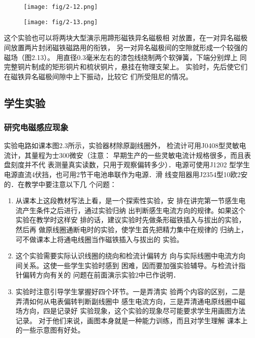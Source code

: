 \begin{figure}[htp]\centering
    \begin{minipage}[t]{0.48\textwidth}
    \centering
\texttt{[image: fig/2-12.png]}
    \caption{}
    \end{minipage}
    \begin{minipage}[t]{0.48\textwidth}
    \centering
\texttt{[image: fig/2-13.png]}
    \caption{}
    \end{minipage}
    \end{figure}

    这个实验也可以将两块大型演示用蹄形磁铁异名磁极相
对放置，在一对异名磁极间放置两片封闭磁铁磁路用的衔铁，
另一对异名磁极间的空隙就形成一个较强的磁场（图2.13）。
用直径0.3毫米左右的漆包线绕制两个软弹簧，下端分别焊上
同完整铜片制成的矩形铜片和梳状铜片，悬挂在物理支架上。
实验时，先后使它们在磁铁异名磁极间隙中上下振动，比较它
们所受阻尼的情况。


\subsection{学生实验}
\subsubsection{研究电磁感应现象}
实验电路如课本图2.3所示，实验器材除原副线圈外，
检流计可用J0408型灵敏电流计，其量程为士300微安（注意：
早期生产的一些灵敏电流计规格很多，而且表盘刻度并不代
表测量真实读数，只用于观察偏转多少）．电源可使用J1202
型学生电源直流4伏挡，也可用2节干电池串联作为电源．滑
线变阻器用J2354型10欧2安的．在教学中要注意以下几
个问题：
\begin{enumerate}
\item 从课本上这段教材写法上看，是一个探索性实验，安
排在讲完第一节感生电流产生条件之后进行，通过实验归纳
出判断感生电流方向的规律。如果这个实验在教学时这样安
排的话，建议实验时先做条形磁铁插入与拔出的实验，然后再
做原线圈通断电时的实验，使学生首先把精力集中在规律的
归纳上，可不做课本上将通电线圈当作磁铁插入与拔出的
实验。
\item 这个实验需要实际认识线圈的绕向和检流计偏转方
向与实际线圈中电流方向间关系。这使一些学生实验时感到
困难，因而要加强实验辅导。与检流计指针偏转方向有关的
问题在前面演示实验2中已作说明．
\item 实验时注意引导学生掌握好四个环节。一是弄清实
验两个内容的区别，二是弄清如何从电表偏转判断副线圈中
感生电流方向，三是弄清通电原线圈中磁场方向，四是记录好
实验现象，这个实验的现象尽可能要求学生用画图方法记录。
对于他们来说，画图本身就是一种能力训练，而且对学生理解
课本上的一些示意图有好处。
\end{enumerate}


